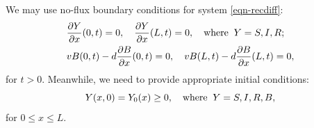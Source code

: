 We may use no-flux boundary conditions for system \eqref{eqn-recdiff}:
\begin{equation}
\begin{aligned}
&  \frac{\partial Y}{\partial x}(0, t) = 0, \quad 
  \frac{\partial Y}{\partial x}(L, t) = 0, \quad {\rm where} \;\; Y = S, I, R; \\
& v B(0, t) - d \frac{\partial B}{\partial x}(0, t) = 0 , \quad
 v B(L, t) - d \frac{\partial B}{\partial x}(L, t) = 0, 
\end{aligned}
 \label{bc-noflux}
\end{equation}
for $ t >0$.
Meanwhile, we need to provide appropriate initial conditions:
\begin{equation}
  Y(x,0) = Y_0(x) \geq 0, \quad {\rm where} \;\; Y = S, I, R, B, 
 \label{ic-host}
\end{equation}
for $0 \leq x \leq L$.





